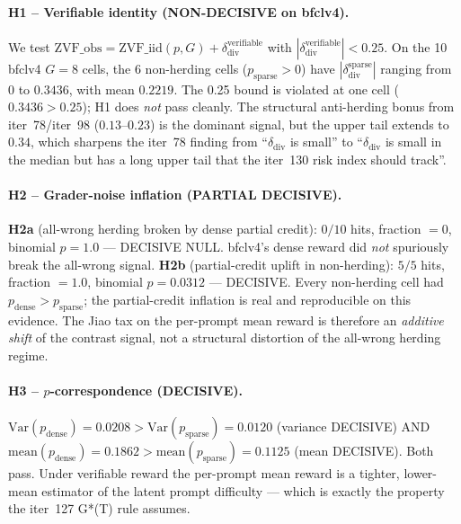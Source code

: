 \paragraph{H1 -- Verifiable identity (NON-DECISIVE on bfclv4).}
We test $\mathrm{ZVF\_obs} = \mathrm{ZVF\_iid}(p, G) +
\delta_{\mathrm{div}}^{\mathrm{verifiable}}$ with
$|\delta_{\mathrm{div}}^{\mathrm{verifiable}}| < 0.25$.
On the 10 bfclv4 $G{=}8$ cells, the 6 non-herding cells
($p_{\mathrm{sparse}} > 0$) have
$|\delta_{\mathrm{div}}^{\mathrm{sparse}}|$ ranging from
$0$ to $0.3436$, with mean $0.2219$. The 0.25 bound is violated
at one cell ($0.3436 > 0.25$); H1 does \emph{not} pass cleanly. The
structural anti-herding bonus from iter~78/iter~98 ($0.13$--$0.23$)
is the dominant signal, but the upper tail extends to $0.34$, which
sharpens the iter~78 finding from ``$\delta_{\mathrm{div}}$ is
small'' to ``$\delta_{\mathrm{div}}$ is small in the median but has
a long upper tail that the iter~130 risk index should track''.

\paragraph{H2 -- Grader-noise inflation (PARTIAL DECISIVE).}
\textbf{H2a} (all-wrong herding broken by dense partial credit):
$0/10$ hits, fraction $= 0$, binomial $p = 1.0$ --- DECISIVE
NULL. bfclv4's dense reward did \emph{not} spuriously break the
all-wrong signal. \textbf{H2b} (partial-credit uplift in
non-herding): $5/5$ hits, fraction $= 1.0$, binomial $p = 0.0312$ ---
DECISIVE. Every non-herding cell had $p_{\mathrm{dense}} >
p_{\mathrm{sparse}}$; the partial-credit inflation is real and
reproducible on this evidence. The Jiao tax on the per-prompt mean
reward is therefore an \emph{additive shift} of the contrast signal,
not a structural distortion of the all-wrong herding regime.

\paragraph{H3 -- $p$-correspondence (DECISIVE).}
$\mathrm{Var}(p_{\mathrm{dense}}) = 0.0208 > \mathrm{Var}(p_{\mathrm{sparse}})
= 0.0120$ (variance DECISIVE) AND
$\mathrm{mean}(p_{\mathrm{dense}}) = 0.1862 >
\mathrm{mean}(p_{\mathrm{sparse}}) = 0.1125$ (mean DECISIVE).
Both pass. Under verifiable reward the per-prompt mean reward
is a tighter, lower-mean estimator of the latent prompt
difficulty --- which is exactly the property the iter~127 G*(T)
rule assumes.

